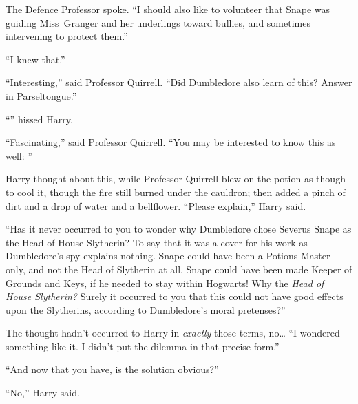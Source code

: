The Defence Professor spoke. “I should also like to volunteer that Snape was
guiding Miss~Granger and her underlings toward bullies, and sometimes
intervening to protect them.”

“I knew that.”

“Interesting,” said Professor Quirrell. “Did Dumbledore also learn of this?
Answer in Parseltongue.”

“” hissed Harry.

“Fascinating,” said Professor Quirrell. “You may be interested to know this as
well: ”

Harry thought about this, while Professor Quirrell blew on the potion as though
to cool it, though the fire still burned under the cauldron; then added a pinch
of dirt and a drop of water and a bellflower. “Please explain,” Harry said.

“Has it never occurred to you to wonder why Dumbledore chose Severus Snape as
the Head of House Slytherin? To say that it was a cover for his work as
Dumbledore’s spy explains nothing. Snape could have been a Potions Master only,
and not the Head of Slytherin at all. Snape could have been made Keeper of
Grounds and Keys, if he needed to stay within Hogwarts! Why the \emph{Head of
House Slytherin?} Surely it occurred to you that this could not have good
effects upon the Slytherins, according to Dumbledore’s moral pretenses?”

The thought hadn’t occurred to Harry in \emph{exactly} those terms, no…
“I wondered something like it. I didn’t put the dilemma in that precise form.”

“And now that you have, is the solution obvious?”

“No,” Harry said.

